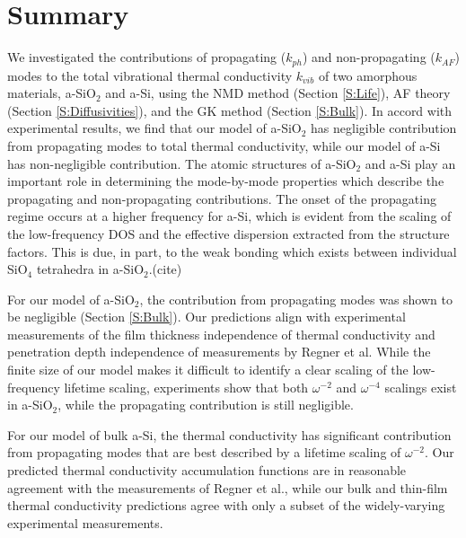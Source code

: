 \documentclass[aps,prb,onecolumn,preprint,superscriptaddress,footinbib,amsmath,amssymb,floatfix]{revtex4}
\begin{document}
\section{\label{S:Lifetimes}Summary}

We investigated the contributions of propagating ($k_{ph}$) 
and non-propagating ($k_{AF}$) modes to the total vibrational 
thermal conductivity $k_{vib}$ of two amorphous materials, 
a-SiO$_2$ and a-Si, using the NMD method (Section \ref{S:Life}),  
AF theory (Section \ref{S:Diffusivities}), and 
the GK method (Section \ref{S:Bulk}). In accord with experimental 
results, we find that our model of a-SiO$_2$ has negligible 
contribution from propagating modes to total thermal conductivity, 
while our model of a-Si has non-negligible contribution. 
The atomic structures of a-SiO$_2$ and a-Si play an important role 
in determining the mode-by-mode properties which describe the 
propagating and non-propagating contributions. The onset of the 
propagating regime occurs at a higher frequency for a-Si, which is 
evident from the scaling of the low-frequency DOS and the effective 
dispersion extracted from the structure factors. This is due, in part, 
to the weak bonding which exists between individual SiO$_4$ 
tetrahedra in a-SiO$_2$.(cite)

For our model of a-SiO$_2$, the contribution from propagating modes 
was shown to be negligible (Section \ref{S:Bulk}). 
Our predictions align with experimental measurements of the film 
thickness independence of thermal conductivity 
\cite{lee_heat_1997,yamane_measurement_2002} 
and penetration depth independence of measurements  
by Regner et al.\cite{regner_broadband_2013}
While the finite size 
of our model makes it difficult to identify a clear scaling 
of the low-frequency lifetime scaling, experiments show that 
both $\omega^{-2}$ and $\omega^{-4}$ scalings exist in 
a-SiO$_2$,\cite{masciovecchio_evidence_2006,baldi_sound_2010,
baldi_emergence_2013} while the propagating contribution 
is still negligible.\cite{love_estimate_1990,lee_heat_1997,
yamane_measurement_2002,baldi_thermal_2008}

For our model of bulk a-Si, 
the thermal conductivity has  
significant contribution from propagating modes that are best 
described by a lifetime scaling of $\omega^{-2}$. Our predicted 
thermal conductivity accumulation functions are in reasonable agreement 
with the measurements of Regner et al., while our  
bulk and thin-film thermal conductivity predictions agree with only 
a subset of the widely-varying experimental measurements. 
\end{document}
